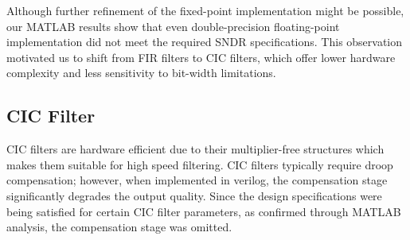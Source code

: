 \documentclass[11pt,onecolumn]{IEEEtran}
\begin{document}
Although further refinement of the fixed-point implementation might be possible, our MATLAB results show that even double-precision floating-point implementation did not meet the required SNDR specifications. This observation motivated us to shift from FIR filters to CIC filters, which offer lower hardware complexity and less sensitivity to bit-width limitations.


\subsection{\textbf{CIC Filter}}
CIC filters are hardware efficient due to their multiplier-free structures which makes them suitable for high speed filtering. CIC filters typically require droop compensation; however, when implemented in verilog, the compensation stage significantly degrades the output quality. Since the design specifications were being satisfied for certain CIC filter parameters, as confirmed through MATLAB analysis, the compensation stage was omitted.
\end{document}
